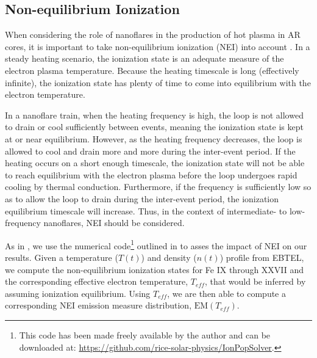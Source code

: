 \documentclass[apj]{emulateapj}
\begin{document}
	\subsection{Non-equilibrium Ionization}
	\label{subsec:nei}
	\par When considering the role of nanoflares in the production of hot plasma in AR cores, it is important to take non-equilibrium ionization (NEI) into account \citep{bradshaw_explosive_2006,reale_nonequilibrium_2008}. In a steady heating scenario, the ionization state is an adequate measure of the electron plasma temperature. Because the heating timescale is long (effectively infinite), the ionization state has plenty of time to come into equilibrium with the electron temperature. 
	\par In a nanoflare train, when the heating frequency is high, the loop is not allowed to drain or cool sufficiently between events, meaning the ionization state is kept at or near equilibrium. However, as the heating frequency decreases, the loop is allowed to cool and drain more and more during the inter-event period. If the heating occurs on a short enough timescale, the ionization state will not be able to reach equilibrium with the electron plasma before the loop undergoes rapid cooling by thermal conduction. Furthermore, if the frequency is sufficiently low so as to allow the loop to drain during the inter-event period, the ionization equilibrium timescale will increase. Thus, in the context of intermediate- to low-frequency nanoflares, NEI should be considered.
	\par As in , we use the numerical code\footnote{This code has been made freely available by the author and can be downloaded at: \url{https://github.com/rice-solar-physics/IonPopSolver}.} outlined in \citet{bradshaw_numerical_2009} to asses the impact of NEI on our results. Given a temperature ($T(t)$) and density ($n(t)$) profile from EBTEL, we compute the non-equilibrium ionization states for Fe IX through XXVII and the corresponding effective electron temperature, $T_{eff}$, that would be inferred by assuming ionization equilibrium. Using $T_{eff}$, we are then able to compute a corresponding NEI emission measure distribution, $\mathrm{EM}(T_{eff})$.
\end{document}

